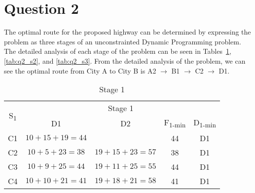 \section*{Question 2}
The optimal route for the proposed highway can be determined by expressing the problem as three stages of an unconstrainted Dynamic Programming problem. The detailed analysis of each stage of the problem can be seen in Tables~\ref{tab:q2_s1}, \ref{tab:q2_s2}, and \ref{tab:q2_s3}. From the detailed analysis of the problem, we can see the optimal route from City A to City B is A2 $\rightarrow$ B1 $\rightarrow$ C2 $\rightarrow$ D1.

\begin{table}[htp]
\centering
\caption{Stage 1}\label{tab:q2_s1}
\begin{tabular}{|c|cccc|}
\hline
	\multirow{2}{*}{S\textsubscript{1}} & \multicolumn{4}{c|}{Stage 1}	\\ \cline{2-5} 
						& \multicolumn{1}{c|}{D1}          		& \multicolumn{1}{c|}{D2}          		& \multicolumn{1}{c|}{F\textsubscript{1-min}} 	& D\textsubscript{1-min} 	\\ \hline
	C1                  & \multicolumn{1}{c|}{$10+15+19=44$} 	& \multicolumn{1}{c|}{}            		& \multicolumn{1}{c|}{44}       				& D1       					\\ \hline
	C2                  & \multicolumn{1}{c|}{$10+5+23=38$}  	& \multicolumn{1}{c|}{$19+15+23=57$} 	& \multicolumn{1}{c|}{38}       				& D1       					\\ \hline
	C3                  & \multicolumn{1}{c|}{$10+9+25=44$}  	& \multicolumn{1}{c|}{$19+11+25=55$} 	& \multicolumn{1}{c|}{44}       				& D1       					\\ \hline
	C4 					& \multicolumn{1}{c|}{$10+10+21=41$} 	& \multicolumn{1}{c|}{$19+18+21=58$} 	& \multicolumn{1}{c|}{41}						& D1 						\\ \hline
\end{tabular}
\end{table}

